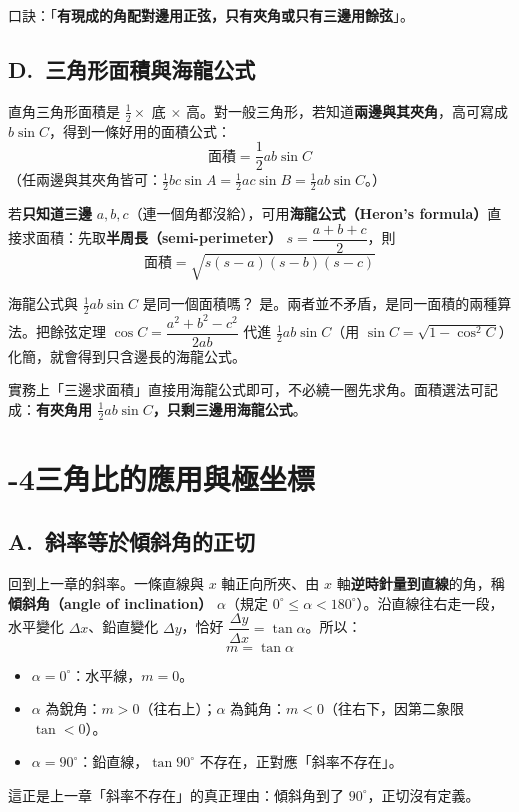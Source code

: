 \documentclass[11pt]{article}
\begin{document}
口訣：「\textbf{有現成的角配對邊用正弦，只有夾角或只有三邊用餘弦}」。

\subsection*{\sffamily D.\ 三角形面積與海龍公式}

直角三角形面積是 $\frac12\times$ 底 $\times$ 高。對一般三角形，若知道\textbf{兩邊與其夾角}，高可寫成 $b\sin C$，得到一條好用的面積公式：
$$\boxed{\;\text{面積}=\frac12ab\sin C\;}$$
（任兩邊與其夾角皆可：$\frac12bc\sin A=\frac12ac\sin B=\frac12ab\sin C$。）

若\textbf{只知道三邊} $a,b,c$（連一個角都沒給），可用\textbf{海龍公式（Heron's formula）}直接求面積：先取\textbf{半周長（semi-perimeter）} $s=\dfrac{a+b+c}{2}$，則
$$\boxed{\;\text{面積}=\sqrt{s(s-a)(s-b)(s-c)}\;}$$

\begin{補充框}{海龍公式與 $\frac12ab\sin C$ 是同一個面積嗎？}
是。兩者並不矛盾，是同一面積的兩種算法。把餘弦定理 $\cos C=\dfrac{a^2+b^2-c^2}{2ab}$ 代進 $\frac12ab\sin C$（用 $\sin C=\sqrt{1-\cos^2 C}$）化簡，就會得到只含邊長的海龍公式。

實務上「三邊求面積」直接用海龍公式即可，不必繞一圈先求角。面積選法可記成：\textbf{有夾角用 $\frac12ab\sin C$，只剩三邊用海龍公式}。
\end{補充框}

\section*{-4\quad 三角比的應用與極坐標}

\subsection*{\sffamily A.\ 斜率等於傾斜角的正切}

回到上一章的斜率。一條直線與 $x$ 軸正向所夾、由 $x$ 軸\textbf{逆時針量到直線}的角，稱\textbf{傾斜角（angle of inclination）} $\alpha$（規定 $0^\circ\le\alpha<180^\circ$）。沿直線往右走一段，水平變化 $\Delta x$、鉛直變化 $\Delta y$，恰好 $\dfrac{\Delta y}{\Delta x}=\tan\alpha$。所以：
$$\boxed{\;m=\tan\alpha\;}$$
\begin{itemize}\setlength{\itemsep}{1pt}
\item $\alpha=0^\circ$：水平線，$m=0$。
\item $\alpha$ 為銳角：$m>0$（往右上）；$\alpha$ 為鈍角：$m<0$（往右下，因第二象限 $\tan<0$）。
\item $\alpha=90^\circ$：鉛直線，$\tan90^\circ$ 不存在，正對應「斜率不存在」。
\end{itemize}
這正是上一章「斜率不存在」的真正理由：傾斜角到了 $90^\circ$，正切沒有定義。
\end{document}

